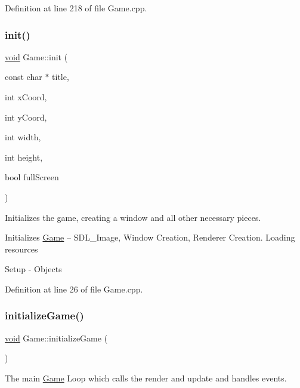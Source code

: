 Definition at line 218 of file Game.\+cpp.

\mbox{\label{class_game_ad1e6a351dffab1beb330bb814b9ba1a6}} 
\subsubsection{\texorpdfstring{init()}{init()}}
{\footnotesize\ttfamily \mbox{\hyperlink{_s_d_l__opengles2__gl2ext_8h_ae5d8fa23ad07c48bb609509eae494c95}{void}} Game\+::init (\begin{DoxyParamCaption}\item[{const char $\ast$}]{title,  }\item[{int}]{x\+Coord,  }\item[{int}]{y\+Coord,  }\item[{int}]{width,  }\item[{int}]{height,  }\item[{bool}]{full\+Screen }\end{DoxyParamCaption})}



Initializes the game, creating a window and all other necessary pieces. 

Initializes \mbox{\hyperlink{class_game}{Game}} -- S\+D\+L\+\_\+\+Image, Window Creation, Renderer Creation. Loading resources

Setup -\/ Objects 

Definition at line 26 of file Game.\+cpp.

\mbox{\label{class_game_a4c2a7ead717a4c13f1ffddafd11e17c8}} 
\subsubsection{\texorpdfstring{initializeGame()}{initializeGame()}}
{\footnotesize\ttfamily \mbox{\hyperlink{_s_d_l__opengles2__gl2ext_8h_ae5d8fa23ad07c48bb609509eae494c95}{void}} Game\+::initialize\+Game (\begin{DoxyParamCaption}{ }\end{DoxyParamCaption})}



The main \mbox{\hyperlink{class_game}{Game}} Loop which calls the render and update and handles events. 



